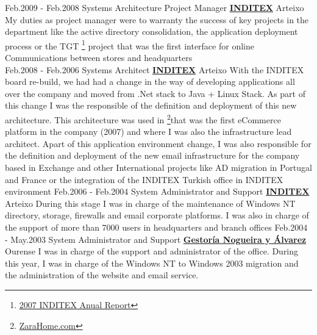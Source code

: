 \documentclass[a4paper]{twentysecondcv} %
\begin{document}
\begin{twenty}  
\twentyitem
    	{Feb.2009 -}
		{Feb.2008}
        {Systems Architecture Project Manager}
        {\href{https://www.inditex.com/}{\textbf{INDITEX}}}
        {Arteixo}
        {
        My duties as project manager were to warranty the success of key projects in the department like the active directory consolidation, the application deployment process or the TGT \footnote{\href {https://www.inditex.com/documents/10279/245898/Memoria_Anual_2007.pdf/74c34dcb-6502-4078-a13c-a4d50c55676b}{2007 INDITEX Anual Report}} project that was the first interface for online Communications between stores and headquarters 
        }
        \\
\twentyitem
    	{Feb.2008 -}
		{Feb.2006}
        {Systems Architect}
        {\href{https://www.inditex.com/}{\textbf{INDITEX}}}
        {Arteixo}
        {
            With the INDITEX board re-build, we had had a change in the way of developing applications all over the company and moved from .Net stack to Java + Linux Stack. As part of this change I was the responsible of the definition and deployment of this new architecture. This architecture was used in \footnote{\href {https://elpais.com/tecnologia/2007/10/28/actualidad/1193560079_850215.html}{ZaraHome.com}}that was the first eCommerce platform in the company (2007) and where I was also the infrastructure lead architect.
    Apart of this application environment change, I was also responsible for the definition and deployment of the new email infrastructure for the company based in Exchange and other International projects like AD migration in Portugal and France or the integration of the INDITEX Turkish office in INDITEX environment
    \newline{}
        }
\twentyitem
    	{Feb.2006 -}
		{Feb.2004}
        {System Administrator and Support}
        {\href{https://www.inditex.com/}{\textbf{INDITEX}}}
        {Arteixo}
        {
        During this stage I was in charge of the maintenance of Windows NT directory, storage, firewalls and email corporate platforms.\newline{}
        I was also in charge of the support of more than 7000 users in headquarters and branch offices
        }
\twentyitem
    	{Feb.2004 -}
		{May.2003}
        {System Administrator and Support}
        {\href{http://www.nogueirayalvarez.es/}{\textbf{Gestor\'ia Nogueira y \'Alvarez}}}
        {Ourense}
        {
        I was in charge of the support and administrator of the office. During this year, I was in charge of the Windows NT to Windows 2003 migration and the administration of the website and email service.
        }
\end{twenty}
\end{document}

